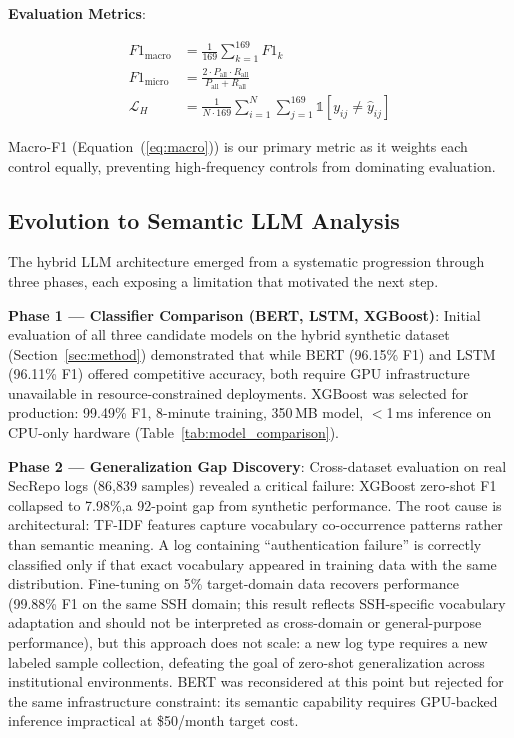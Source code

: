 \documentclass[futureinternet,article,submit,pdftex,moreauthors]{Definitions/mdpi}
\begin{document}
\textbf{Evaluation Metrics}:
\begin{linenomath}
\begin{align}
F1_{\text{macro}} &= \frac{1}{169}\sum_{k=1}^{169} F1_k \label{eq:macro}\\
F1_{\text{micro}} &= \frac{2 \cdot P_{\text{all}} \cdot R_{\text{all}}}{P_{\text{all}} + R_{\text{all}}} \label{eq:micro}\\
\mathcal{L}_{H} &= \frac{1}{N \cdot 169}\sum_{i=1}^{N}\sum_{j=1}^{169} \mathbb{1}[y_{ij} \neq \hat{y}_{ij}] \label{eq:hamming}
\end{align}
\end{linenomath}

Macro-F1 (Equation~(\ref{eq:macro})) is our primary metric as it weights each control
equally, preventing high-frequency controls from dominating evaluation.

\subsection{Evolution to Semantic LLM Analysis}

The hybrid LLM architecture emerged from a systematic progression through three phases, each
exposing a limitation that motivated the next step.

\textbf{Phase 1 — Classifier Comparison (BERT, LSTM, XGBoost)}: Initial evaluation of all
three candidate models on the hybrid synthetic dataset (Section~\ref{sec:method}) demonstrated
that while BERT (96.15\% F1) and LSTM (96.11\% F1) offered competitive accuracy, both require
GPU infrastructure unavailable in resource-constrained deployments. XGBoost was selected for
production: 99.49\% F1, 8-minute training, 350\,MB model, ${<}$1\,ms inference on CPU-only
hardware (Table~\ref{tab:model_comparison}).

\textbf{Phase 2 — Generalization Gap Discovery}: Cross-dataset evaluation on real SecRepo logs
(86{,}839 samples) revealed a critical failure: XGBoost zero-shot F1 collapsed to 7.98\%,a
92-point gap from synthetic performance. The root cause is architectural: TF-IDF features
capture vocabulary co-occurrence patterns rather than semantic meaning. A log containing
``authentication failure'' is correctly classified only if that exact vocabulary appeared in
training data with the same distribution. Fine-tuning on 5\% target-domain data recovers
performance (99.88\% F1 on the same SSH domain; this result reflects SSH-specific
vocabulary adaptation and should not be interpreted as cross-domain or general-purpose
performance), but this approach does not scale: a new log type requires a new
labeled sample collection, defeating the goal of zero-shot generalization across institutional
environments. BERT was reconsidered at this point but rejected for the same infrastructure
constraint: its semantic capability requires GPU-backed inference impractical at
\$50/month target cost.
\end{document}

